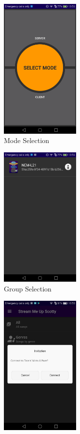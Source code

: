 \begin{figure}[ht]
  \begin{subfigure}[b]{0.33\linewidth}
    \centering
    \includegraphics[trim={0cm 0cm 0cm 0cm}, clip, height=7cm]{img/ui/mode_selection.png}
    \caption{Mode Selection}
    \label{fig:mode_selection}
    \vspace{4ex}
  \end{subfigure}%
  \begin{subfigure}[b]{0.33\linewidth}
    \centering
    \includegraphics[trim={0cm 0cm 0cm 0cm}, clip, height=7cm]{img/ui/group_selection.png}
    \caption{Group Selection}
    \label{fig:group_selection}
    \vspace{4ex}
  \end{subfigure}%
  \begin{subfigure}[b]{0.33\linewidth}
    \centering
    \includegraphics[trim={0cm 0cm 0cm 0cm}, clip, height=7cm]{img/ui/wifi_direct_invitation.png}

\end{subfigure}
\end{figure}
